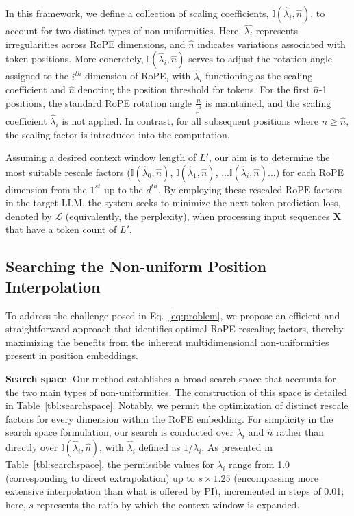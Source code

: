 In this framework, we define a collection of scaling coefficients, $\mathbb{I}(\hat{\lambda}_{i},\hat{n})$, to account for two distinct types of non-uniformities. Here, $\hat{\lambda_i}$ represents irregularities across RoPE dimensions, and $\hat{n}$ indicates variations associated with token positions. More concretely, $\mathbb{I}(\hat{\lambda}_{i},\hat{n})$ serves to adjust the rotation angle assigned to the $i^{th}$ dimension of RoPE, with $\hat\lambda_{i}$ functioning as the scaling coefficient and $\hat{n}$ denoting the position threshold for tokens. For the first $\hat{n}$-1 positions, the standard RoPE rotation angle $\frac{n}{\beta^i}$ is maintained, and the scaling coefficient $\hat\lambda_{i}$ is not applied. In contrast, for all subsequent positions where $n\ge\hat{n}$, the scaling factor is introduced into the computation.

Assuming a desired context window length of $L'$, our aim is to determine the most suitable rescale factors ($\mathbb{I}(\hat{\lambda}_{0},\hat{n})$, $\mathbb{I}(\hat{\lambda}_{1},\hat{n})$, ...$\mathbb{I}(\hat{\lambda}_{i},\hat{n})$...) for each RoPE dimension from the $1^{st}$ up to the $d^{th}$. By employing these rescaled $\text{RoPE}$ factors in the target $\text{LLM}$, the system seeks to minimize the next token prediction loss, denoted by $\mathcal{L}$ (equivalently, the perplexity), when processing input sequences $\mathbf{X}$ that have a token count of $L'$.

\subsection{Searching the Non-uniform Position Interpolation}

To address the challenge posed in Eq.~\ref{eq:problem}, we propose an efficient and straightforward approach that identifies optimal RoPE rescaling factors, thereby maximizing the benefits from the inherent multidimensional non-uniformities present in position embeddings.

\textbf{Search space}. Our method establishes a broad search space that accounts for the two main types of non-uniformities. The construction of this space is detailed in Table~\ref{tbl:searchspace}. Notably, we permit the optimization of distinct rescale factors for every dimension within the RoPE embedding. For simplicity in the search space formulation, our search is conducted over $\lambda_i$ and $\hat{n}$ rather than directly over $\mathbb{I}(\hat{\lambda}_{i},\hat{n})$, with $\hat{\lambda}_{i}$ defined as $1/\lambda_i$. As presented in Table~\ref{tbl:searchspace}, the permissible values for $\lambda_i$ range from 1.0 (corresponding to direct extrapolation) up to $s\times1.25$ (encompassing more extensive interpolation than what is offered by PI), incremented in steps of 0.01; here, $s$ represents the ratio by which the context window is expanded.

